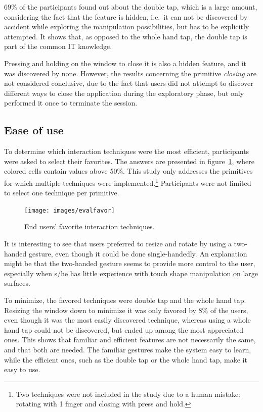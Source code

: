 69\% of the participants found out about the double tap, which is a large amount, considering the fact that the feature is hidden, i.e.\ it can not be discovered by accident while exploring the manipulation possibilities, but has to be explicitly attempted.
It shows that, as opposed to the whole hand tap, the double tap is part of the common IT knowledge.

Pressing and holding on the window to close it is also a hidden feature, and it was discovered by none.
However, the results concerning the primitive \emph{closing} are not considered conclusive, due to the fact that users did not attempt to discover different ways to close the application during the exploratory phase, but only performed it once to terminate the session.

\subsection{Ease of use}

To determine which interaction techniques were the most efficient, participants were asked to select their favorites.
The answers are presented in figure~\ref{fig:evalfavor}, where colored cells contain values above 50\%.
This study only addresses the primitives for which multiple techniques were implemented.\footnote{Two techniques were not included in the study due to a human mistake: rotating with 1 finger and closing with press and hold.}
Participants were not limited to select one technique per primitive.

\begin{figure}[htb]
  \centering
    \texttt{[image: images/evalfavor]}
    \caption{End users' favorite interaction techniques.}
    \label{fig:evalfavor}
\end{figure}

It is interesting to see that users preferred to resize and rotate by using a two-handed gesture, even though it could be done single-handedly.
An explanation might be that the two-handed gesture seems to provide more control to the user, especially when s/he has little experience with touch shape manipulation on large surfaces.

To minimize, the favored techniques were double tap and the whole hand tap.
Resizing the window down to minimize it was only favored by 8\% of the users, even though it was the most easily discovered technique, whereas using a whole hand tap could not be discovered, but ended up among the most appreciated ones.
This shows that familiar and efficient features are not necessarily the same, and that both are needed.
The familiar gestures make the system easy to learn, while the efficient ones, such as the double tap or the whole hand tap, make it easy to use.

